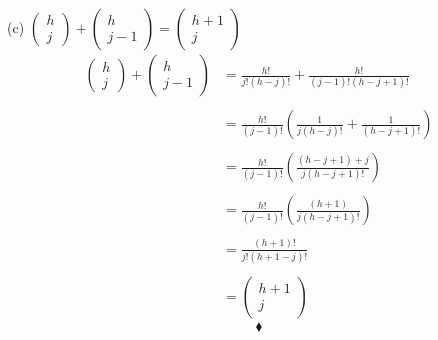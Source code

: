 (c) $\left(\begin{matrix}h\\ j\end{matrix}\right)+\left(\begin{matrix}h\\ j-1\end{matrix}\right)=\left(\begin{matrix}h+1\\ j\end{matrix}\right)$\\
\begin{align*}
\left(\begin{matrix}h\\ j\end{matrix}\right)+\left(\begin{matrix}h\\ j-1\end{matrix}\right)&=\frac{h!}{j!(h- j)!}+\frac{h!}{(j-1)!(h- j+1)!}\\\\
&=\frac{h!}{(j-1)!}\left(\frac{1}{j(h-j)!}+\frac{1}{(h-j+1)!}\right)\\\\
&=\frac{h!}{(j-1)!}\left(\frac{(h-j+1)+j}{j(h-j+1)!}\right)\\\\
&=\frac{h!}{(j-1)!}\left(\frac{(h+1)}{j(h-j+1)!}\right)
\\\\
&=\frac{(h+1)!}{j!(h+1-j)!}\\\\
&= \left(\begin{matrix}h+1\\ j\end{matrix}\right)
\end{align*}
$$\blacklozenge$$
\newpage
